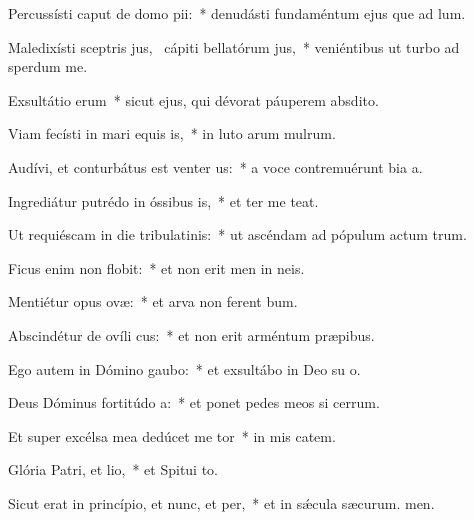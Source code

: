 \item Percussísti caput de domo pii:~* denudásti fundaméntum ejus que ad lum.
\item Maledixísti sceptris jus,~\pscross{} cápiti bellatórum jus,~* veniéntibus ut turbo ad sperdum me.
\item Exsultátio erum~* sicut ejus, qui dévorat páuperem  absdito.
\item Viam fecísti in mari equis is,~* in luto arum mulrum.
\item Audívi, et conturbátus est venter us:~* a voce contremuérunt bia a.
\item Ingrediátur putrédo in óssibus is,~* et ter me teat.
\item Ut requiéscam in die tribulatinis:~* ut ascéndam ad pópulum actum trum.
\item Ficus enim non flobit:~* et non erit men in neis.
\item Mentiétur opus ovæ:~* et arva non ferent bum.
\item Abscindétur de ovíli cus:~* et non erit arméntum  præpibus.
\item Ego autem in Dómino gaubo:~* et exsultábo in Deo su o.
\item Deus Dóminus fortitúdo a:~* et ponet pedes meos si cerrum.
\item Et super excélsa mea dedúcet me tor~* in mis catem.
\item Glória Patri, et lio,~* et Spitui to.
\item Sicut erat in princípio, et nunc, et per,~* et in sǽcula sæcurum. men.
